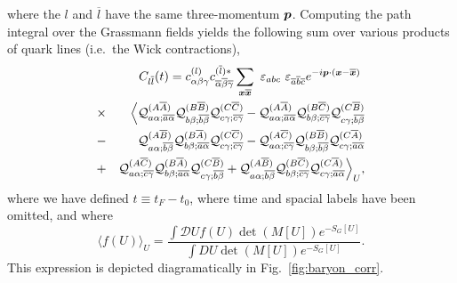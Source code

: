 where the $l$ and $\overline l$ have the same three-momentum $\boldsymbol{p}$. Computing the path integral over the Grassmann fields yields the following sum over various products of quark lines (i.e.\ the Wick contractions),
\begin{eqnarray*}
&&C_{l\overline{l}}(t)
= c^{(l)}_{\alpha\beta\gamma}
c^{(\overline{l})\ast}_{
\overline{\alpha}\overline{\beta}\overline{\gamma}}
\sum_{\boldsymbol{x}\overline{\boldsymbol{x}}}\ \varepsilon_{abc}
\   \varepsilon_{\overline{a}\overline{b}\overline{c}} 
e^{-i\boldsymbol{p}\cdot(\boldsymbol{x}-\overline{\boldsymbol{x}})}\  \nonumber\\
&\times& \Bigl\langle {\cal Q}^{(A\overline{A})}_{
a\alpha ;\overline{a}\overline{\alpha}}
{\cal Q}^{(B\overline{B})}_{b\beta ;\overline{b}\overline{\beta}}
{\cal Q}^{(C\overline{C})}_{c\gamma ;\overline{c}\overline{\gamma}}
-{\cal Q}^{(A\overline{A})}_{a\alpha;\overline{a}\overline{\alpha}}
{\cal Q}^{(B\overline{C})}_{b\beta   ;\overline{c}\overline{\gamma}}
{\cal Q}^{(C\overline{B})}_{c\gamma ;\overline{b}\overline{\beta}}
\nonumber\\
&-&{\cal Q}^{(A\overline{B})}_{a\alpha;\overline{b}\overline{\beta}}
{\cal Q}^{(B\overline{A})}_{b\beta  ;\overline{a}\overline{\alpha}}
{\cal Q}^{(C\overline{C})}_{c\gamma ;\overline{c}\overline{\gamma}}
- {\cal Q}^{(A\overline{C})}_{a\alpha;\overline{c}\overline{\gamma}}
{\cal Q}^{(B\overline{B})}_{b\beta ;\overline{b}\overline{\beta}}
{\cal Q}^{(C\overline{A})}_{c\gamma ;\overline{a}\overline{\alpha}}
\nonumber\\
&+&
{\cal Q}^{(A\overline{C})}_{a\alpha;\overline{c}\overline{\gamma}}
{\cal Q}^{(B\overline{A})}_{b\beta ;\overline{a}\overline{\alpha}}
{\cal Q}^{(C\overline{B})}_{c\gamma ;\overline{b}\overline{\beta}}
+{\cal Q}^{(A\overline{B})}_{a\alpha;\overline{b}\overline{\beta}}
{\cal Q}^{(B\overline{C})}_{b\beta ;\overline{c}\overline{\gamma}}
{\cal Q}^{(C\overline{A})}_{c\gamma ;\overline{a}\overline{\alpha}}
\Bigr\rangle_U,
\end{eqnarray*}
where we have defined $t\equiv t_F - t_0$, where time and spacial labels have been omitted, and where
\begin{equation}
    \langle f(U)\rangle_{U}=\frac{\int \mathcal{D} U f(U) \operatorname{det}(M[U]) e^{-S_{G}[U]}}{\int D U \operatorname{det}(M[U]) e^{-S_{G}[U]}}.
\end{equation}
This expression is depicted diagramatically in Fig.~\ref{fig:baryon_corr}.

